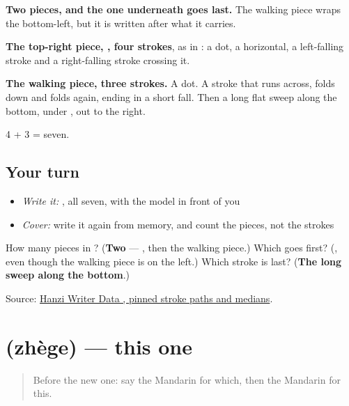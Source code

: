 \begin{quote}
\end{quote}

\textbf{Two pieces, and the one underneath goes last.} The walking piece wraps the bottom-left, but it is written after what it carries.

\textbf{The top-right piece, , four strokes}, as in : a dot, a horizontal, a left-falling stroke and a right-falling stroke crossing it.

\textbf{The walking piece, three strokes.} A dot. A stroke that runs across, folds down and folds again, ending in a short fall. Then a long flat sweep along the bottom, under , out to the right.

4 + 3 = seven.

\subsection*{Your turn}
\begin{itemize}
\raggedright
  \item \emph{Write it:} , all seven, with the model in front of you
  \item \emph{Cover:} write it again from memory, and count the pieces, not the strokes
\end{itemize}

\begin{tcolorbox}[breakable,colback=teal!4,colframe=teal!35!black,title={Before you move on}]
How many pieces in ? (\textbf{Two} — , then the walking piece.) Which goes first? (\textbf{}, even though the walking piece is on the left.) Which stroke is last? (\textbf{The long sweep along the bottom}.)

Source: \href{https://raw.githubusercontent.com/chanind/hanzi-writer-data/68d10a4b21150cae5e1ebbd223eed289cf32d90c/data/\%E8\%BF\%99.json}{Hanzi Writer Data , pinned stroke paths and medians}.
\end{tcolorbox}
\section[\texorpdfstring{\zh{这个} (zhège)}{这个 (zhège)}]{ (zhège) — this one}

\label{lesson:ZH-C37-zhege}



\begin{quote}
Before the new one: say the Mandarin for which, then the Mandarin for this.
\end{quote}

